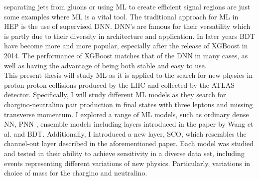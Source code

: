 separating jets from gluons \cite{PhysRevD.44.2025} or using \ac{ML} to create efficient signal regions \cite{baldi_searching_2014} are just some examples
where \ac{ML} is a vital tool. The traditional approach for \ac{ML} in \ac{HEP} is the use of supervised
\ac{DNN}. \ac{DNN}'s are famous for their versatility which is partly due to their diversity in architecture and 
application. In later years \ac{BDT} have become more and more popular, especially after the release of XGBoost \cite{XGB}
in 2014. The performance of XGBoost matches that of the \ac{DNN} in many cases, as well as having the advantage 
of being both stable and easy to use. \newline
\\
This present thesis will study \ac{ML} as it is applied to the search for new physics in proton-proton collisions produced by the \ac{LHC} and collected by 
the \acs{ATLAS} detector. Specifically, I will study different \ac{ML} models as they search for chargino-neutralino pair production in final states 
with three leptons and missing transverse momentum. I explored a range of \ac{ML} models, such as ordinary dense \acl{NN}, \acl{PNN} \cite{PNN},
ensemble models including layers introduced in the paper by Wang et al. \cite{wang_maxout_2013} and \acl{BDT}. Additionally, I introduced a new layer, \acl{SCO}, which 
resembles the channel-out layer described in the aforementioned paper. Each model was studied and tested in their ability to achieve sensitivity in a diverse 
data set, including events representing different variations of new physics. Particularly, variations in choice of mass for the chargino and neutralino.
\newpage
